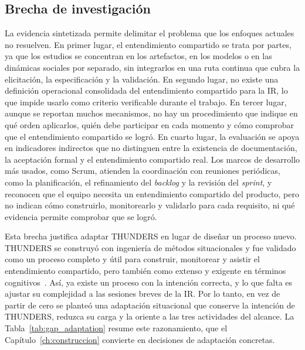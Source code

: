 \documentclass[12pt,letterpaper,oneside]{report}
\begin{document}
\subsection{Brecha de investigación}
\label{sec:brecha}
La evidencia sintetizada permite delimitar el problema que los enfoques
actuales no resuelven. En primer lugar, el entendimiento compartido se trata
por partes, ya que los estudios se concentran en los artefactos, en los modelos
o en las dinámicas sociales por separado, sin integrarlos en una ruta continua
que cubra la elicitación, la especificación y la validación. En segundo lugar,
no existe una definición operacional consolidada del entendimiento compartido
para la IR, lo que impide usarlo como criterio verificable durante el trabajo.
En tercer lugar, aunque se reportan muchos mecanismos, no hay un procedimiento
que indique en qué orden aplicarlos, quién debe participar en cada momento y
cómo comprobar que el entendimiento compartido se logró. En
cuarto lugar, la evaluación se apoya en indicadores indirectos que no
distinguen entre la existencia de documentación, la aceptación formal y el
entendimiento compartido real. Los marcos de desarrollo más usados, como Scrum, atienden la coordinación con
reuniones periódicas, como la planificación, el refinamiento del
\textit{backlog} y la revisión del \textit{sprint}, y reconocen que el equipo
necesita un entendimiento compartido del producto, pero no indican cómo
construirlo, monitorearlo y validarlo para cada requisito, ni qué evidencia
permite comprobar que se logró.

Esta brecha justifica adaptar THUNDERS en lugar de diseñar un proceso nuevo.
THUNDERS se construyó con ingeniería de métodos situacionales y fue validado
como un proceso completo y útil para construir, monitorear y asistir el
entendimiento compartido, pero también como extenso y exigente en términos
cognitivos~\cite{agredo2022thesis,agredo2022exploratory}. Así, ya existe un proceso con la intención correcta, y lo que falta es ajustar
su complejidad a las sesiones breves de la IR. Por lo tanto, en vez de partir de cero se
planteó una adaptación situacional que conserve la intención de THUNDERS,
reduzca su carga y la oriente a las tres actividades del alcance. La
Tabla~\ref{tab:gap_adaptation} resume este razonamiento, que el
Capítulo~\ref{ch:construccion} convierte en decisiones de adaptación concretas.
\end{document}
